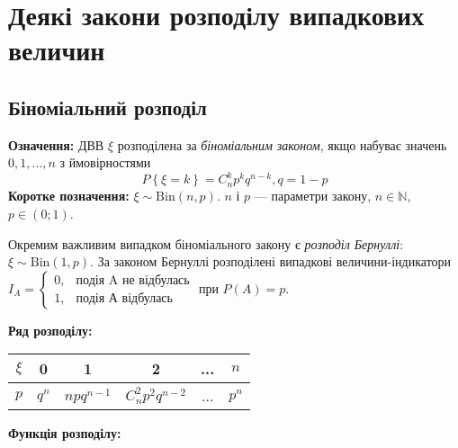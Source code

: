 \section{Деякі закони розподілу випадкових величин}

\subsection{Біноміальний розподіл}
\noindent\textbf{Означення:}
    ДВВ $\xi$ розподілена за \emph{біноміальним законом}, 
    якщо набуває значень $0,1,...,n$ з ймовірностями \begin{equation}
        P\left\{\xi = k\right\} = C_n^k p^k q^{n-k}, q = 1 - p
    \end{equation}
\textbf{Коротке позначення:} $\xi \sim \mathrm{Bin}(n, p)$.
    $n$ і $p$ --- параметри закону, $n\in \mathbb{N}$, $p\in (0;1)$.

Окремим важливим випадком біноміального закону є \emph{розподіл Бернуллі}: $\xi \sim \mathrm{Bin}(1, p)$.
За законом Бернуллі розподілені випадкові величини-індикатори $I_A = \begin{cases}
    0, & \text{подія A не відбулась}\\ 1, & \text{подія А відбулась}
\end{cases}$ при $P(A) = p$.

\noindent\textbf{Ряд розподілу:}

\begin{tabular}{c|c|c|c|c|c}
    $\xi$ & 0 & 1 & 2 & ... & $n$ \\
    \hline
    $p$ & $q^n$ & $npq^{n-1}$ & $C_n^2 p^2 q^{n-2}$ & ... & $p^n$
\end{tabular}

\noindent\textbf{Функція розподілу:}

